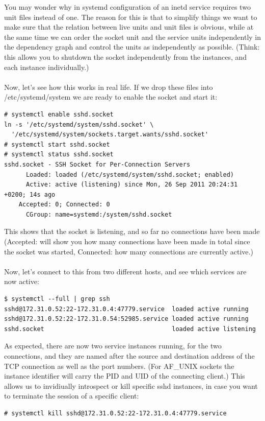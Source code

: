 \documentclass[titlepage]{article}
\begin{document}
You may wonder why in systemd configuration of an inetd service requires two unit files instead of one. The reason for this is that to simplify things we want to make sure that the relation between live units and unit files is obvious, while at the same time we can order the socket unit and the service units independently in the dependency graph and control the units as independently as possible. (Think: this allows you to shutdown the socket independently from the instances, and each instance individually.)
\\
\\
Now, let's see how this works in real life. If we drop these files into /etc/systemd/system we are ready to enable the socket and start it:
\begin{lstlisting}
# systemctl enable sshd.socket
ln -s '/etc/systemd/system/sshd.socket' \
  '/etc/systemd/system/sockets.target.wants/sshd.socket'
# systemctl start sshd.socket
# systemctl status sshd.socket
sshd.socket - SSH Socket for Per-Connection Servers
      Loaded: loaded (/etc/systemd/system/sshd.socket; enabled)
      Active: active (listening) since Mon, 26 Sep 2011 20:24:31 +0200; 14s ago
    Accepted: 0; Connected: 0
      CGroup: name=systemd:/system/sshd.socket
\end{lstlisting}
This shows that the socket is listening, and so far no connections have been made (Accepted: will show you how many connections have been made in total since the socket was started, Connected: how many connections are currently active.)
\\
\\
Now, let's connect to this from two different hosts, and see which services are now active:
\begin{lstlisting}
$ systemctl --full | grep ssh
sshd@172.31.0.52:22-172.31.0.4:47779.service  loaded active running       
sshd@172.31.0.52:22-172.31.0.54:52985.service loaded active running       
sshd.socket                                   loaded active listening     
\end{lstlisting}
As expected, there are now two service instances running, for the two connections, and they are named after the source and destination address of the TCP connection as well as the port numbers. (For AF\_UNIX sockets the instance identifier will carry the PID and UID of the connecting client.) This allows us to invidiually introspect or kill specific sshd instances, in case you want to terminate the session of a specific client:
\begin{lstlisting}
# systemctl kill sshd@172.31.0.52:22-172.31.0.4:47779.service
\end{lstlisting}
\end{document}
